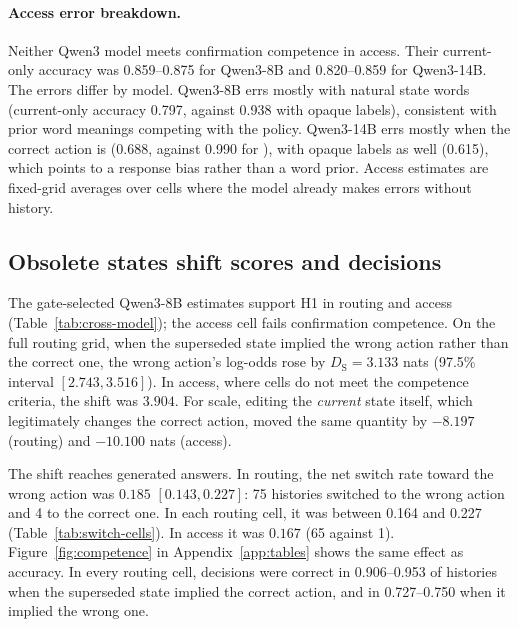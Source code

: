 \paragraph{Access error breakdown.} Neither Qwen3 model meets confirmation competence in access.
Their current-only accuracy was 0.859--0.875 for Qwen3-8B and 0.820--0.859 for
Qwen3-14B. The errors differ by model. Qwen3-8B errs mostly with natural state words (current-only accuracy
0.797, against 0.938 with opaque labels), consistent with prior word meanings competing with the policy.
Qwen3-14B errs mostly when the correct action is  (0.688, against 0.990 for ), with
opaque labels as well (0.615), which points to a response bias rather than a word prior. Access estimates are
fixed-grid averages over cells where the model already makes errors without history.

\subsection{Obsolete states shift scores and decisions}
\label{sec:results-h1}

The gate-selected Qwen3-8B estimates support H1 in routing and access
(Table~\ref{tab:cross-model}); the access cell fails confirmation competence. On the full routing grid, when the superseded state implied the wrong action rather
than the correct one, the wrong action's log-odds rose by $D_{\mathrm{S}} = 3.133$ nats
(97.5\% interval $[2.743, 3.516]$). In access, where cells do not meet the competence criteria, the shift
was $3.904$. For scale, editing the \emph{current} state itself, which legitimately
changes the correct action, moved the same quantity by $-8.197$ (routing) and $-10.100$ nats (access).

The shift reaches generated answers. In routing, the net switch rate toward the wrong action was $0.185$
$[0.143, 0.227]$: 75 histories switched to the wrong action and 4 to the correct one. In each routing
cell, it was between 0.164 and 0.227 (Table~\ref{tab:switch-cells}). In access it was $0.167$ (65 against 1). Figure~\ref{fig:competence} in Appendix~\ref{app:tables} shows the same effect as accuracy. In every
routing cell, decisions were correct in 0.906--0.953 of histories when the superseded state implied the
correct action, and in 0.727--0.750 when it implied the wrong one.


